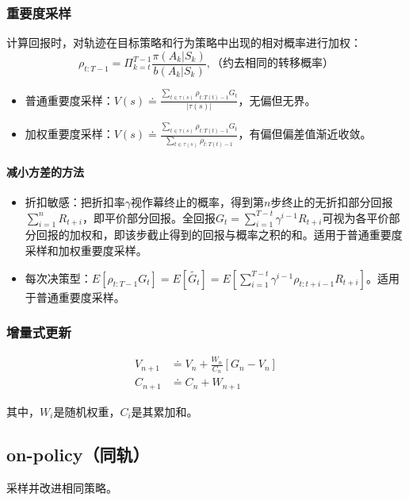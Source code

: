 \documentclass[
12pt, %
a4paper, 
oneside, %
headinclude,footinclude, %
]{scrartcl}
\begin{document}
\subsubsection{重要度采样}
计算回报时，对轨迹在目标策略和行为策略中出现的相对概率进行加权：
$$
\rho_{t:T - 1} = \Pi_{k = t}^{T - 1} \frac{\pi(A_k|S_k)}{b(A_k|S_k)}, \text{（约去相同的转移概率）}
$$
\begin{itemize}
\item 普通重要度采样：$ V(s) \doteq \frac{\sum_{t \in \tau(s)} \rho_{t:T(t) - 1}G_t}{|\tau(s)|} $，无偏但无界。
\item 加权重要度采样：$ V(s) \doteq \frac{\sum_{t \in \tau(s)} \rho_{t:T(t) - 1}G_t}{\sum_{t \in \tau(s)} \rho_{t:T(t) - 1}} $，有偏但偏差值渐近收敛。
\end{itemize}
\paragraph{减小方差的方法}
\begin{itemize}
\item 折扣敏感：把折扣率$ \gamma $视作幕终止的概率，得到第$ n $步终止的无折扣部分回报$ \sum_{i = 1}^n R_{t + i} $，即平价部分回报。全回报$ G_t = \sum_{i = 1}^{T - t} \gamma^{i - 1}R_{t + i} $可视为各平价部分回报的加权和，即该步截止得到的回报与概率之积的和。适用于普通重要度采样和加权重要度采样。
\item 每次决策型：$ E[\rho_{t:T - 1}G_t] = E[\tilde{G_t}] = E[\sum_{i = 1}^{T - t} \gamma^{i - 1} \rho_{t:t + i - 1}R_{t + i}] $。适用于普通重要度采样。
\end{itemize}
\subsubsection{增量式更新}
\begin{align*}
V_{n + 1} &\doteq V_n + \frac{W_n}{C_n}[G_n - V_n] \\
C_{n + 1} &\doteq C_n + W_{n + 1}
\end{align*}

其中，$ W_i $是随机权重，$ C_i $是其累加和。
\subsection{on-policy（同轨）}
采样并改进相同策略。
\end{document}
